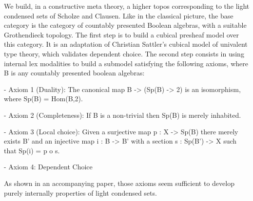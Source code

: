 We build, in a constructive meta theory, a higher topos corresponding to the light condensed sets of Scholze and Clausen.
Like in the classical picture, the base category is the category of countably presented Boolean algebras, with a suitable Grothendieck topology.
The first step is to build a cubical presheaf model over this category. It is an adaptation of Christian Sattler's cubical model of univalent type theory, which validates dependent choice. The second step consists in using internal lex modalities to build a submodel satisfying the following axioms, where B is any countably presented boolean algebras:

- Axiom 1 (Duality): The canonical map B -> (Sp(B) -> 2) is an isomorphism, where Sp(B) = Hom(B,2).

- Axiom 2 (Completeness): If B is a non-trivial then Sp(B) is merely inhabited.

- Axiom 3 (Local choice): Given a surjective map p : X -> Sp(B) there merely exists B' and an injective map
i : B -> B' with a section s : Sp(B') -> X such that Sp(i) = p o s.

- Axiom 4: Dependent Choice

As shown in an accompanying paper, those axioms seem sufficient to develop purely internally properties of light condensed sets.